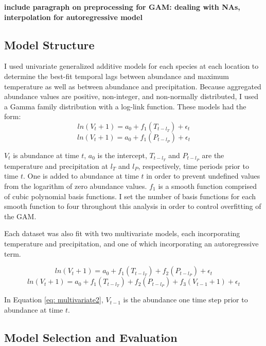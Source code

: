 \textbf{include paragraph on preprocessing for GAM: dealing with NAs, interpolation for autoregressive model}

\subsection{Model Structure}

I used univariate generalized additive models for each species at each location to determine the best-fit temporal lags between abundance and maximum temperature as well as between abundance and precipitation. Because aggregated abundance values are positive, non-integer, and non-normally distributed, I used a Gamma family distribution with a log-link function. These models had the form:
\begin{equation}
	ln(V_t + 1) = a_0 + f_1(T_{t-l_T}) + \epsilon_t
	\label{eq: univariateT}
\end{equation}
\begin{equation}
	ln(V_t + 1) = a_0 + f_1(P_{t-l_P}) + \epsilon_t
	\label{eq: univariateP}
\end{equation}


$V_t$ is abundance at time $t$, $a_0$ is the intercept, $T_{t-l_T}$ and $P_{t-l_P}$ are the temperature and precipitation at $l_T$ and $l_P$, respectively, time periods prior to time $t$. One is added to abundance at time $t$ in order to prevent undefined values from the logarithm of zero abundance values. $f_1$ is a smooth function comprised of cubic polynomial basis functions. I set the number of basis functions for each smooth function to four throughout this analysis in order to control overfitting of the GAM. 

Each dataset was also fit with two multivariate models, each incorporating temperature and precipitation, and one of which incorporating an autoregressive term. 

\begin{equation}
	ln(V_t + 1) = a_0 + f_1(T_{t-l_T}) + f_2(P_{t-l_P}) + \epsilon_t
	\label{eq: multivariate1}
\end{equation}
\begin{equation}
	ln(V_t + 1) = a_0 + f_1(T_{t-l_T}) + f_2(P_{t-l_P}) + f_3(V_{t-1} + 1) + \epsilon_t
	\label{eq: multivariate2}
\end{equation}

In Equation \ref{eq: multivariate2}, $V_{t-1}$ is the abundance one time step prior to abundance at time $t$. 

\subsection{Model Selection and Evaluation}


